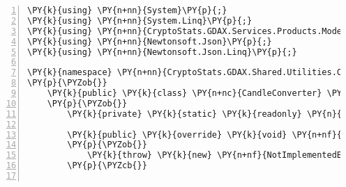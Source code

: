 \def\PYZbs{\char`\\}
\def\PYZus{\char`\_}
\def\PYZob{\char`\{}
\def\PYZcb{\char`\}}
\def\PYZca{\char`\^}
\def\PYZam{\char`\&}
\def\PYZlt{\char`\<}
\def\PYZgt{\char`\>}
\def\PYZsh{\char`\#}
\def\PYZpc{\char`\%}
\def\PYZdl{\char`\$}
\def\PYZhy{\char`\-}
\def\PYZsq{\char`\'}
\def\PYZdq{\char`\"}
\def\PYZti{\char`\~}
\def\PYZat{@}
\def\PYZlb{[}
\def\PYZrb{]}
\makeatother\begin{Verbatim}[commandchars=\\\{\},numbers=left,firstnumber=1,stepnumber=1,numberblanklines=0]
\PY{k}{using} \PY{n+nn}{System}\PY{p}{;}
\PY{k}{using} \PY{n+nn}{System.Linq}\PY{p}{;}
\PY{k}{using} \PY{n+nn}{CryptoStats.GDAX.Services.Products.Models}\PY{p}{;}
\PY{k}{using} \PY{n+nn}{Newtonsoft.Json}\PY{p}{;}
\PY{k}{using} \PY{n+nn}{Newtonsoft.Json.Linq}\PY{p}{;}

\PY{k}{namespace} \PY{n+nn}{CryptoStats.GDAX.Shared.Utilities.Converters}
\PY{p}{\PYZob{}}
    \PY{k}{public} \PY{k}{class} \PY{n+nc}{CandleConverter} \PY{p}{:} \PY{n}{JsonConverter}
    \PY{p}{\PYZob{}}
        \PY{k}{private} \PY{k}{static} \PY{k}{readonly} \PY{n}{DateTime} \PY{n}{UnixEpoch} \PY{p}{=} \PY{k}{new} \PY{n}{DateTime}\PY{p}{(}\PY{l+m}{1}\PY{l+m}{9}\PY{l+m}{7}\PY{l+m}{0}\PY{p}{,} \PY{l+m}{1}\PY{p}{,} \PY{l+m}{1}\PY{p}{,} \PY{l+m}{0}\PY{p}{,} \PY{l+m}{0}\PY{p}{,} \PY{l+m}{0}\PY{p}{,} \PY{n}{DateTimeKind}\PY{p}{.}\PY{n}{Utc}\PY{p}{)}\PY{p}{;}

        \PY{k}{public} \PY{k}{override} \PY{k}{void} \PY{n+nf}{WriteJson}\PY{p}{(}\PY{n}{JsonWriter} \PY{n}{writer}\PY{p}{,} \PY{k+kt}{object} \PY{k}{value}\PY{p}{,} \PY{n}{JsonSerializer} \PY{n}{serializer}\PY{p}{)}
        \PY{p}{\PYZob{}}
            \PY{k}{throw} \PY{k}{new} \PY{n+nf}{NotImplementedException}\PY{p}{(}\PY{p}{)}\PY{p}{;}
        \PY{p}{\PYZcb{}}


\end{Verbatim}
